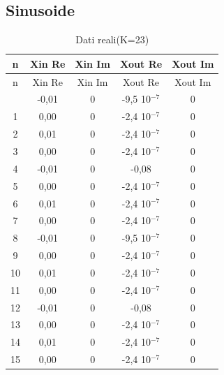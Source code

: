 \documentclass[a4paper, titlepage]{article}
\begin{document}
\subsection{Sinusoide}\label{tab:sin}
\begin{longtable}{*5c}
\caption{Dati reali(K=23)}
\label{}\\
\toprule
n & Xin Re & Xin Im & Xout Re & Xout Im \\
\midrule
\endfirsthead
n & Xin Re & Xin Im & Xout Re & Xout Im \\
\midrule
\endhead
\midrule
\endfoot
\bottomrule
\endlastfoot
0 & -0,01 & 0 & -9,5 10$^{-7}$ & 0\\
1 & 0,00   & 0 & -2,4 10$^{-7}$ & 0\\
2 & 0,01    & 0 & -2,4 10$^{-7}$ & 0\\
3 & 0,00   & 0 & -2,4 10$^{-7}$ & 0 \\
4 & -0,01    & 0 & -0,08 & 0\\
5 & 0,00    & 0 & -2,4 10$^{-7}$ & 0\\
6 & 0,01    & 0 & -2,4 10$^{-7}$& 0\\
7 & 0,00    & 0 & -2,4 10$^{-7}$ & 0\\
8 & -0,01    & 0 & -9,5 10$^{-7}$ & 0\\
9 & 0,00    & 0 & -2,4 10$^{-7}$ & 0\\
10& 0,01    & 0 & -2,4 10$^{-7}$ & 0 \\
11& 0,00    & 0 & -2,4 10$^{-7}$ & 0\\
12& -0,01    & 0 & -0,08 & 0\\
13& 0,00    & 0 & -2,4 10$^{-7}$ & 0\\
14& 0,01    & 0 & -2,4 10$^{-7}$& 0\\
15 & 0,00 & 0 & -2,4 10$^{-7}$ & 0\\ 
\end{longtable}
\newpage
\end{document}
